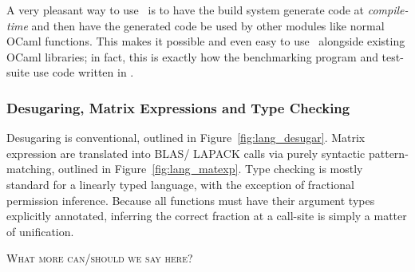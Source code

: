 A very pleasant way to use \lang\ is to have the build system generate code at
\emph{compile-time} and then have the generated code be used by other modules
like normal OCaml functions. This makes it possible and even easy to use \lang\
alongside existing OCaml libraries; in fact, this is exactly how the
benchmarking program and test-suite use code written in \lang.

\subsubsection{Desugaring, Matrix Expressions and Type Checking}\label{subsubsec:initial}

Desugaring is conventional, outlined in Figure~\ref{fig:lang_desugar}.  Matrix
expression are translated into BLAS/ LAPACK calls via purely syntactic
pattern-matching, outlined in Figure~\ref{fig:lang_matexp}. Type checking is
mostly standard for a linearly typed language, with the exception of fractional
permission inference.  Because all functions must have their argument types
explicitly annotated, inferring the correct fraction at a call-site is simply a
matter of unification.

\textsc{What more can/should we say here?}

